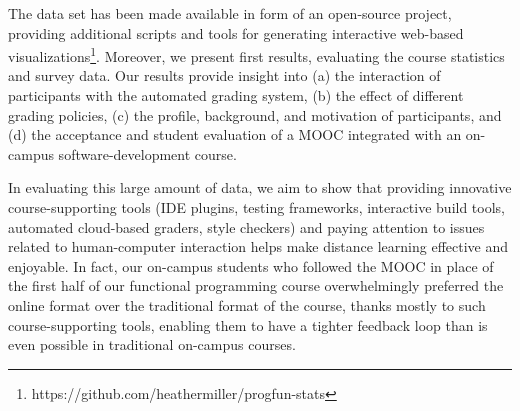 \documentclass{sig-alternate}
\begin{document}
The data set has been made available in form of an open-source project, providing additional scripts and tools for generating interactive web-based visualizations\footnote{https://github.com/heathermiller/progfun-stats}. Moreover, we present first results, evaluating the course statistics and survey data. Our results provide insight into (a) the interaction of participants with the automated grading system, (b) the effect of different grading policies, (c) the profile, background, and motivation of participants, and (d) the acceptance and student evaluation of a MOOC integrated with an on-campus software-development course.

In evaluating this large amount of data, we aim to show that providing innovative course-supporting tools (IDE plugins, testing frameworks, interactive build tools, automated cloud-based graders, style checkers) and paying attention to issues related to human-computer interaction helps make distance learning effective and enjoyable. In fact, our on-campus students who followed the MOOC in place of the first half of our functional programming course overwhelmingly preferred the online format over the traditional format of the course, thanks mostly to such course-supporting tools, enabling them to have a tighter feedback loop than is even possible in traditional on-campus courses.




\end{document}
